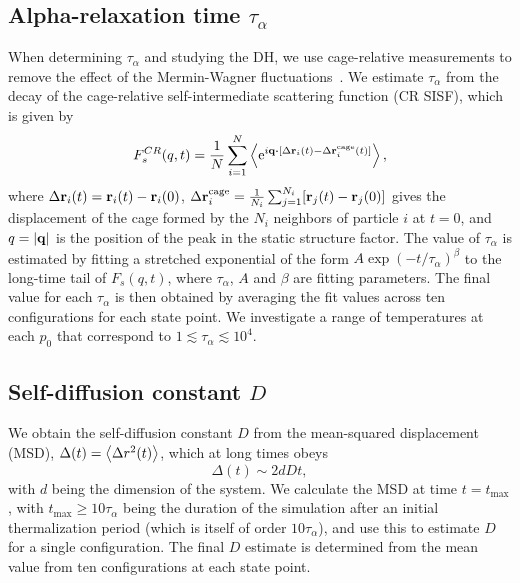 \documentclass[amsmath,amssymb,prl,reprint,twocolumn]{revtex4-2}
\begin{document}
\subsection{Alpha-relaxation time $\tau_{\alpha}$}
When determining $\tau_{\alpha}$ and studying the DH, we use cage-relative measurements to remove the effect of the Mermin-Wagner fluctuations~\cite{Mazoyer2009,Vivek2017,Illing2017,Shiba2019}.
We estimate $\tau_{\alpha}$ from the decay of the cage-relative self-intermediate scattering function (CR SISF), which is given by
\begin{equation}
F_{s}^{CR}(q,t) = \frac{1}{N} \sum_{i=1}^N \expval{\mathrm{e}^{i\vb{q}\vdot[\Delta\vb{r}_i(t)-\Delta\vb{r}_i^{\text{cage}}(t)]}},
\end{equation}
where $\Delta\vb{r}_i(t)=\vb{r}_i(t)-\vb{r}_i(0)$, $\Delta\vb{r}_i^{\text{cage}} = \frac{1}{N_i}\sum_{j=1}^{N_i}[\vb{r}_j(t)-\vb{r}_j(0)]$  gives the displacement of the cage formed by the $N_i$ neighbors of particle $i$ at $t=0$, and $q = \abs{\vb{q}}$ is the position of the peak in the static structure factor.
The value of $\tau_{\alpha}$ is estimated by fitting a stretched exponential of the form $A\exp(-t/\tau_{\alpha})^{\beta}$ to the long-time tail of $F_s(q,t)$, where $\tau_{\alpha}$, $A$ and $\beta$ are fitting parameters.
The final value for each $\tau_{\alpha}$ is then obtained by averaging the fit values across ten configurations for each state point.
We investigate a range of temperatures at each $p_0$ that correspond to $1\lesssim\tau_{\alpha}\lesssim10^4$.






\subsection{Self-diffusion constant $D$}
We obtain the self-diffusion constant $D$ from the mean-squared displacement (MSD), $\Delta(t) = \expval{\Delta r^2(t)}$, which at long times obeys
\begin{equation}
    \Delta (t) \sim 2 d D t,
\end{equation}
with $d$ being the dimension of the system. 
We calculate the MSD at time $t=t_{\text{max}}$, with $t_{\text{max}}\geq 10\tau_{\alpha}$ being the duration of the simulation after an initial thermalization period (which is itself of order $10\tau_{\alpha}$), and use this to estimate $D$ for a single configuration. 
The final $D$ estimate is determined from the mean value from ten configurations at each state point.
\end{document}
